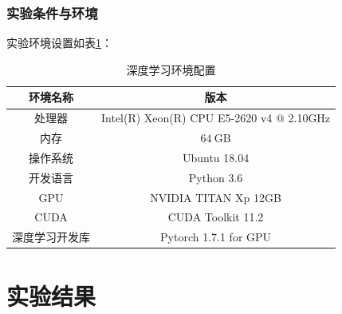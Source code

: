 \subsubsection*{实验条件与环境}
实验环境设置如表\ref{tab:env_para}：
\begin{table}
	\caption{\label{tab:env_para}深度学习环境配置}
	\centering
	\small
	\begin{tabular}{cc}
		\hline 环境名称 & 版本 \\
		\hline 处理器 & Intel(R) Xeon(R) CPU E5-2620 v4 @ 2.10GHz \\
		内存 & $64 \mathrm{~GB}$ \\
		操作系统 & Ubuntu 18.04 \\
		开发语言 & Python 3.6 \\
		GPU & NVIDIA TITAN Xp 12GB \\
		CUDA & CUDA Toolkit 11.2 \\
		深度学习开发库 & Pytorch 1.7.1 for GPU \\
		\hline
		\end{tabular}
\end{table}

\section{实验结果}
